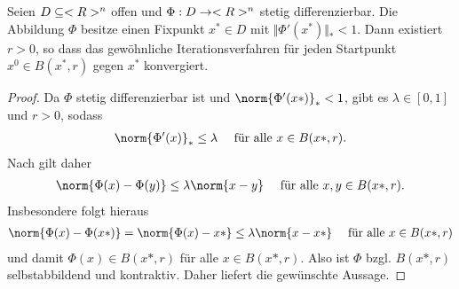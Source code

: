 \begin{proposition}[Ostrowski]
	Seien $D \subseteq <R>^n$ offen und $\Phi: D \to <R>^n$ stetig differenzierbar. Die Abbildung $\Phi$ besitze einen Fixpunkt $x^{\ast} \in D$ mit $\Vert \Phi'(x^{\ast})\Vert_{\ast} < 1$. Dann existiert $r > 0$, so dass das gewöhnliche Iterationsverfahren für jeden Startpunkt $x^0 \in B(x^{\ast}, r)$ gegen $x^{\ast}$ konvergiert.
\end{proposition}

\begin{proof}
	Da $\Phi$ stetig differenzierbar ist und $\norm{\Phi'(x*)}_{\ast} < 1$, gibt es $\lambda \in[0,1]$ und $r > 0$, sodass
	\begin{align}
		\norm{\Phi'(x)}_{\ast} \le \lambda \quad \text{ für alle } x\in B(x*,r).\notag
	\end{align}
	Nach  gilt daher
	\begin{align}
		\norm{\Phi(x) - \Phi(y)}\le \lambda\norm{x-y} \quad\text{ für alle }x,y \in B(x*,r).
	\end{align}
	Insbesondere folgt hieraus
	\begin{align}
		\norm{\Phi(x) - \Phi(x*)} = \norm{\Phi(x) - x*} \le \lambda \norm{x-x*} \quad \text{ für alle } x \in B(x*,r)
	\end{align}
	und damit $\Phi(x) \in B(x*,r)$ für alle $x \in B(x*,r)$. Also ist $\Phi$ bzgl. $B(x*,r)$ selbstabbildend und kontraktiv. Daher liefert  die gewünschte Aussage.
\end{proof}